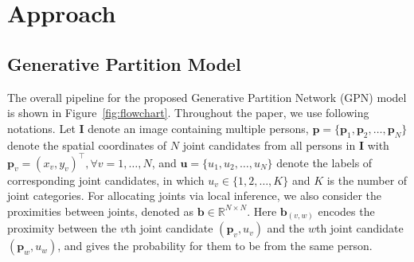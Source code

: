 \documentclass[10pt,twocolumn,letterpaper]{article}
\begin{document}
\section{Approach}

\subsection{Generative Partition Model}

The overall pipeline for the proposed  Generative Partition Network (GPN) model is shown in Figure~\ref{fig:flowchart}. Throughout the paper, we use following notations. Let  $\mathbf{I}$ denote an image containing multiple persons, $\mathbf{p}{=}\{\mathbf{p}_1,\mathbf{p}_2,\ldots, \mathbf{p}_N\}$ denote the spatial coordinates  of $N$ joint candidates from all persons in $\mathbf{I}$ with $\mathbf{p}_v{=}(x_v,y_v)^\top, \forall v{=}1,\ldots,N$, and $\mathbf{u}{=}\{u_1, u_2,\ldots,u_N\}$ denote the labels of corresponding joint candidates, in which $u_v{\in}\{1, 2, \ldots, K\}$ and  $K$  is the number of joint categories. For allocating joints via local inference, we also consider the proximities  between  joints, denoted as $\mathbf{b}{\in}\mathbb{R}^{N \times N} $. Here $\mathbf{b}_{(v,w)}$ encodes the proximity  between  the $v$th joint candidate $(\mathbf{p}_v, u_v)$
and the $w$th joint candidate $(\mathbf{p}_w, u_w)$, and gives the probability for them to be from the same person.
\end{document}
